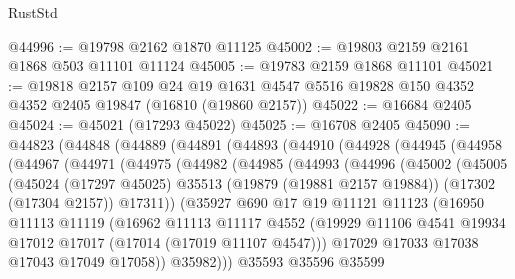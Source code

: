 \begin{lexlean}{RustStd}
\begin{coremodule}
{\begin{coremodule}
{{{{{{{{{{{{{{{{{{{{{{{{{{{{{{{{{{{{{{{{{{{{{{{{{{{{{{{@44996 := @19798 @2162 @1870 @11125
@45002 := @19803 @2159 @2161 @1868 @503 @11101 @11124
@45005 := @19783 @2159 @1868 @11101
@45021 := @19818
    @2157
    @109
    @24
    @19
    @1631
    @4547
    @5516
    @19828
    @150
    @4352
    @4352
    @2405
    @19847
    (@16810 (@19860 @2157))
@45022 := @16684 @2405
@45024 := @45021 (@17293 @45022)
@45025 := @16708 @2405
@45090 := @44823
    (@44848
      (@44889
        (@44891
          (@44893
            (@44910
              (@44928
                (@44945
                  (@44958
                    (@44967
                      (@44971
                        (@44975
                          (@44982
                            (@44985
                              (@44993
                                (@44996
                                  (@45002
                                    (@45005
                                      (@45024
                                        (@17297 @45025)
                                        @35513
                                        (@19879 (@19881 @2157 @19884))
                                        (@17302 (@17304 @2157))
                                        @17311))
                                    (@35927
                                      @690
                                      @17
                                      @19
                                      @11121
                                      @11123
                                      (@16950
                                        @11113
                                        @11119
                                        (@16962
                                          @11113
                                          @11117
                                          @4552
                                          (@19929
                                            @11106
                                            @4541
                                            @19934
                                            @17012
                                            @17017
                                            (@17014 (@17019 @11107 @4547)))
                                          @17029
                                          @17033
                                          @17038
                                          @17043
                                          @17049
                                          @17058))
                                      @35982)))
                                @35593
                                @35596
                                @35599
}}}}}}}}}}}}}}}}}}}}}}}}}}}}}}}}}}}}}}}}}}}}}}}}}}}}}}}
\end{coremodule}}
\end{coremodule}
\end{lexlean}
